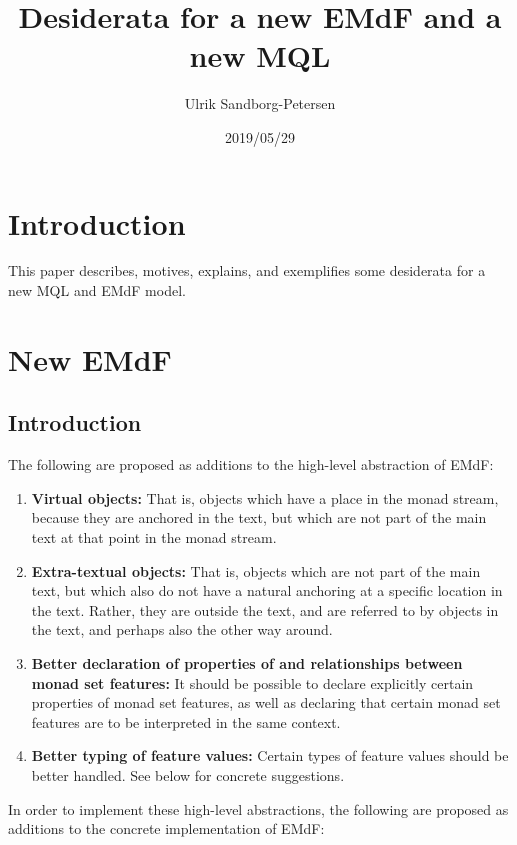 \documentclass[a4paper,12pt]{article}
\begin{document}
\title{Desiderata for a new EMdF and a new MQL}
\author{Ulrik Sandborg-Petersen}
\date{2019/05/29}

\section{Introduction}

This paper describes, motives, explains, and exemplifies some
desiderata for a new MQL and EMdF model.

\section{New EMdF}

\subsection{Introduction}

The following are proposed as additions to the high-level abstraction
of EMdF:

\begin{enumerate}
\item \textbf{Virtual objects:} That is, objects which have a place in
  the monad stream, because they are anchored in the text, but which
  are not part of the main text at that point in the monad stream.
  
\item \textbf{Extra-textual objects:} That is, objects which are not
  part of the main text, but which also do not have a natural
  anchoring at a specific location in the text.  Rather, they are
  outside the text, and are referred to by objects in the text, and
  perhaps also the other way around.

\item \textbf{Better declaration of properties of and relationships
  between monad set features:} It should be possible to declare
  explicitly certain properties of monad set features, as well as
  declaring that certain monad set features are to be interpreted in
  the same context.

\item \textbf{Better typing of feature values:} Certain types of
  feature values should be better handled.  See below for concrete
  suggestions.
\end{enumerate}

\noindent In order to implement these high-level abstractions, the
following are proposed as additions to the concrete implementation of
EMdF:
\end{document}

